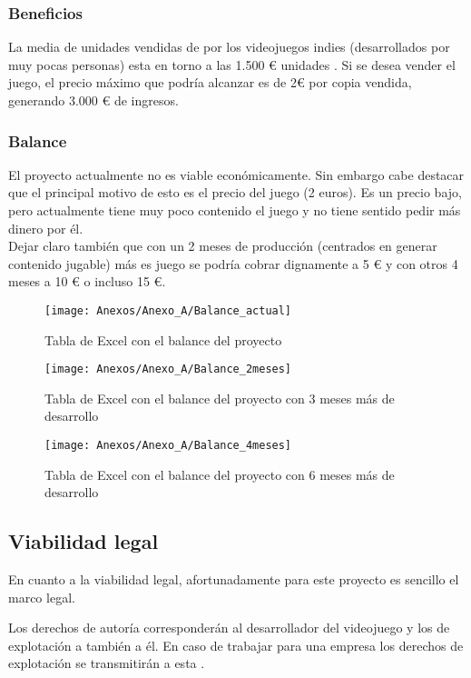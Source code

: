 \subsubsection{Beneficios}
La media de unidades vendidas de por los videojuegos indies (desarrollados por muy pocas personas) esta en torno a las 1.500 € unidades \cite{Unidades}. Si se desea vender el juego, el precio máximo que podría alcanzar es de 2€ por copia vendida, generando 3.000 € de ingresos.

\subsubsection{Balance}
El proyecto actualmente no es viable económicamente. Sin embargo cabe destacar que el principal motivo de esto es el precio del juego (2 euros). Es un precio bajo, pero actualmente tiene muy poco contenido el juego y no tiene sentido pedir más dinero por él.\\
Dejar claro también que con un 2 meses de producción (centrados en generar contenido jugable) más es juego se podría cobrar dignamente a 5 € y con otros 4 meses a 10 € o incluso 15 €.

\begin{figure}[h]
\centering
\texttt{[image: Anexos/Anexo\_A/Balance\_actual]}
\caption{Tabla de Excel con el balance del proyecto}
\end{figure}

\begin{figure}[h]
\centering
\texttt{[image: Anexos/Anexo\_A/Balance\_2meses]}
\caption{Tabla de Excel con el balance del proyecto con 3 meses más de desarrollo}
\end{figure}

\clearpage
\begin{figure}[h]
\centering
\texttt{[image: Anexos/Anexo\_A/Balance\_4meses]}
\caption{Tabla de Excel con el balance del proyecto con 6 meses más de desarrollo}
\end{figure}

\subsection{Viabilidad legal}
En cuanto a la viabilidad legal, afortunadamente para este proyecto es sencillo el marco legal.

Los derechos de autoría corresponderán al desarrollador del videojuego y los de explotación a también a él. En caso de trabajar para una empresa los derechos de explotación se transmitirán a esta \cite{PropiedadIntelectual}.

